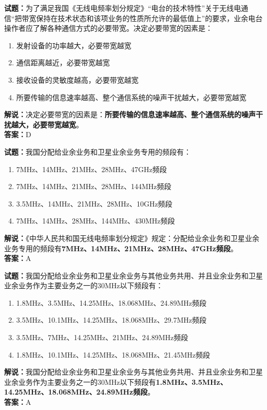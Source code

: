 \documentclass{ctexbook}
\begin{document}
\bigskip

\noindent\textbf{试题：}为了满足我国《无线电频率划分规定》“电台的技术特性”关于无线电通信“把带宽保持在技术状态和该项业务的性质所允许的最低值上”的要求，业余电台操作者应了解各种通信方式的必要带宽。决定必要带宽的因素是：
\begin{enumerate}[leftmargin=3em]
  \item 发射设备的功率越大，必要带宽越宽
  \item 通信距离越近，必要带宽越宽
  \item 接收设备的灵敏度越高，必要带宽越宽
  \item 所要传输的信息速率越高、整个通信系统的噪声干扰越大，必要带宽越宽
\end{enumerate}
\noindent\textbf{解说：}决定必要带宽的因素是：\textbf{所要传输的信息速率越高、整个通信系统的噪声干扰越大，必要带宽越宽}。\\\noindent\textbf{答案：}D

\bigskip

\noindent\textbf{试题：}我国分配给业余业务和卫星业余业务专用的频段有：
\begin{enumerate}[leftmargin=3em]
  \item 7\unit{\MHz}、14\unit{\MHz}、21\unit{\MHz}、28\unit{\MHz}、47\unit{\GHz}频段
  \item 7\unit{\MHz}、14\unit{\MHz}、21\unit{\MHz}、28\unit{\MHz}、144\unit{\MHz}频段
  \item 3.5\unit{\MHz}、14\unit{\MHz}、21\unit{\MHz}、28\unit{\MHz}、10\unit{\GHz}频段
  \item 7\unit{\MHz}、14\unit{\MHz}、28\unit{\MHz}、144\unit{\MHz}、430\unit{\MHz}频段
\end{enumerate}
\noindent\textbf{解说：}《中华人民共和国无线电频率划分规定》规定：分配给业余业务和卫星业余业务专用的频段有\textbf{7\unit{\MHz}、14\unit{\MHz}、21\unit{\MHz}、28\unit{\MHz}、47\unit{\GHz}频段}。\\\noindent\textbf{答案：}A
\bigskip

\noindent\textbf{试题：}我国分配给业余业务和卫星业余业务与其他业务共用、并且业余业务和卫星业余业务作为主要业务之一的30\unit{\MHz}以下频段有：
\begin{enumerate}[leftmargin=3em]
  \item 1.8\unit{\MHz}、3.5\unit{\MHz}、14.25\unit{\MHz}、18.068\unit{\MHz}、24.89\unit{\MHz}频段
  \item 3.5\unit{\MHz}、10.1\unit{\MHz}、14.25\unit{\MHz}、18.068\unit{\MHz}、29.7\unit{\MHz}频段
  \item 3.5\unit{\MHz}、7\unit{\MHz}、14.25\unit{\MHz}、21\unit{\MHz}、24.89\unit{\MHz}频段
  \item 1.8\unit{\MHz}、10.1\unit{\MHz}、14.25\unit{\MHz}、18.068\unit{\MHz}、21.45\unit{\MHz}频段
\end{enumerate}
\noindent\textbf{解说：}我国分配给业余业务和卫星业余业务与其他业务共用、并且业余业务和卫星业余业务作为主要业务之一的30\unit{\MHz}以下频段有\textbf{1.8\unit{\MHz}、3.5\unit{\MHz}、14.25\unit{\MHz}、18.068\unit{\MHz}、24.89\unit{\MHz}频段}。\\\noindent\textbf{答案：}A
\bigskip
\end{document}
